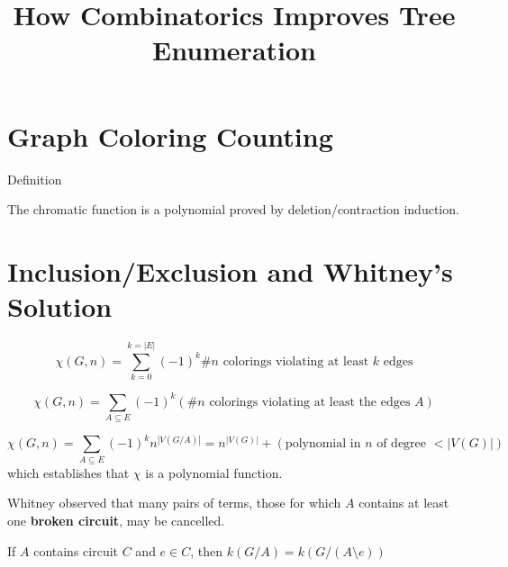 \documentclass{article}
\title{How Combinatorics Improves Tree Enumeration}
\begin{document}
\maketitle

\section{Graph Coloring Counting}

Definition

The chromatic function is a polynomial proved by deletion/contraction
induction.

\section{Inclusion/Exclusion and Whitney's Solution}

\[
\chi(G,n) = \sum_{k=0}^{k=|E|}(-1)^k \text{\# }n\text{ colorings violating at least }
k\text{ edges}
\]

\[
\chi(G,n) = \sum_{A\subseteq E}(-1)^k 
(\text{\# }n\text{ colorings violating at least the edges }A)
\]

\[
\chi(G,n) = \sum_{A\subseteq E}(-1)^k 
n^{|V(G/A)|} = n^{|V(G)|} + (\text{polynomial in } n \text{ of degree } < |V(G)|)
\]
which establishes that $\chi$ is a polynomial function.  

Whitney\cite{WhitLogExpMath} observed that 
many pairs of terms, those for which $A$ contains at least 
one \textbf{broken circuit}, may be cancelled.

If $A$ contains circuit $C$ and $e\in C$, then $k(G/A) = k(G/(A\setminus e))$
\end{document}
